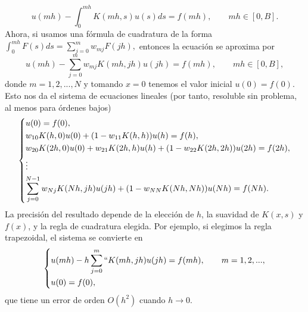 \begin{equation}
	u(mh) - \int_{0}^{mh}K(mh,s)u(s)ds = f(mh), \qquad mh \in [0,B].
\end{equation}
Ahora, si usamos una fórmula de cuadratura de la forma $\displaystyle \int_{0}^{mh}F(s)ds = \displaystyle \sum_{j=0}^{m} w_{mj}F(jh),$ entonces la ecuación se aproxima por
\begin{equation}
	u(mh) - \sum_{j=0}^{m}w_{mj}K(mh,jh)u(jh) = f(mh),\qquad mh \in [0,B],
\end{equation}
donde $m = 1,2,...,N$ y tomando $x = 0$ tenemos el valor inicial $u(0) = f(0)$. Esto nos da el sistema de ecuaciones lineales (por tanto, resoluble sin problema, al menos para órdenes bajos)
\begin{equation}
	\begin{dcases}
		u(0) = f(0), \\ w_{10}K(h,0)u(0)+(1-w_{11}K(h,h))u(h) = f(h), \\ w_{20}K(2h,0)u(0)+w_{21}K(2h,h)u(h)+(1-w_{22}K(2h,2h))u(2h) = f(2h), \\ \vdots \\ \displaystyle \sum_{j=0}^{N-1}w_{Nj}K(Nh,jh)u(jh)+(1-w_{NN}K(Nh,Nh))u(Nh) = f(Nh). 
	\end{dcases}
\end{equation}
La precisión del resultado depende de la elección de $h$, la suavidad de $K(x,s)$ y $f(x)$, y la regla de cuadratura elegida. Por ejemplo, si elegimos la regla trapezoidal, el sistema se convierte en
\begin{equation}\label{eq:trapecio}
	\begin{dcases}
		u(mh) - h \displaystyle \sum_{j=0}^{m}``K(mh,jh)u(jh) = f(mh), \qquad m = 1,2,..., \\ u(0) = f(0),
	\end{dcases}
\end{equation}
que tiene un error de orden $O(h^2)$ cuando $h \rightarrow 0$.
